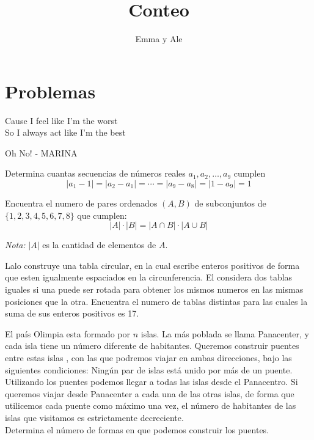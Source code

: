 \documentclass[11pt]{scrartcl}
\title {Conteo}
\author{Emma y Ale}
\newcommand{\thmdifficulty}{0}
\newcommand{\problemdiff}[1]{\renewcommand{\thmdifficulty}{#1}}
\begin{document}
\maketitle


\section{Problemas}
\epigraph{Cause I feel like I'm the worst\\
So I always act like I'm the best}{Oh No! - MARINA}



\problemdiff{2}
\begin{problem}
    Determina cuantas secuencias de números reales $a_1, a_2, \ldots, a_9$ cumplen
    \[|a_1-1|=|a_2-a_1|=\cdots=|a_9-a_8|=|1-a_9|=1\]
\end{problem}

\problemdiff{3}
\begin{problem}
    Encuentra el numero de pares ordenados $(A,B)$ de subconjuntos de $\{1,2,3,4,5,6,7,8\}$ que cumplen:
    $$|A| \cdot |B| = |A \cap B| \cdot |A \cup B|$$

    \textit{Nota: } $|A|$ es la cantidad de elementos de $A$.
\end{problem}

\problemdiff{3}
\begin{problem}
    Lalo construye una tabla circular, en la cual escribe enteros positivos de forma que esten igualmente espaciados en la circunferencia. El considera dos tablas iguales si una puede ser rotada para obtener los mismos numeros en las mismas posiciones que la otra. Encuentra el numero de tablas distintas para las cuales la suma de sus enteros positivos es 17.
\end{problem}

\problemdiff{3}
\begin{problem}
    El país Olimpia esta formado por $n$ islas. La más poblada se llama Panacenter, y cada isla tiene un número diferente de habitantes. Queremos construir puentes entre estas islas , con las que podremos 
    viajar en ambas direcciones, bajo las siguientes condiciones: Ningún par de islas está unido por más de un puente. Utilizando
los puentes podemos llegar a todas las islas desde el Panacentro. Si queremos viajar desde Panacenter a cada
una de las otras islas, de forma que utilicemos cada puente como máximo una vez, el número de habitantes
de las islas que visitamos es estrictamente decreciente. \\
Determina el número de formas en que podemos construir los puentes.
\end{problem}
\end{document}
